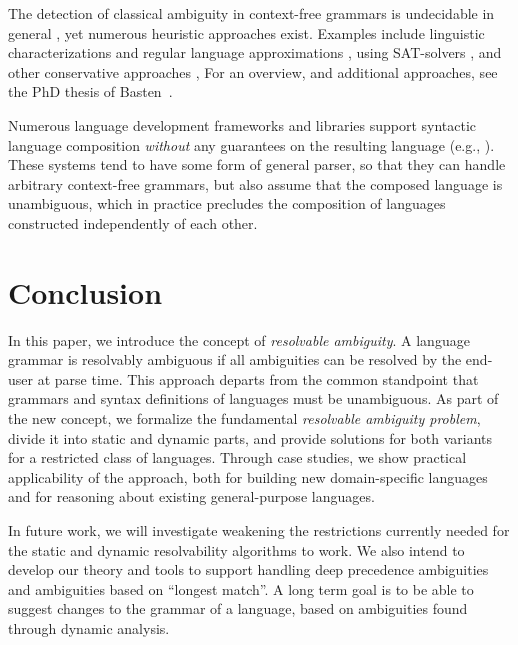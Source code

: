 \documentclass[runningheads]{llncs}
\begin{document}
The detection of classical ambiguity in context-free grammars is undecidable in general \cite{cantorAmbiguityProblemBackus1962}, yet numerous heuristic approaches exist. Examples include linguistic characterizations and regular language approximations \cite{brabrandAnalyzingAmbiguityContextFree2007}, using SAT-solvers \cite{axelssonAnalyzingContextFreeGrammars2008}, and other conservative approaches \cite{schmitzConservativeAmbiguityDetection2007}, For an overview, and additional approaches, see the PhD thesis of Basten~\cite{bastenAmbiguityDetectionProgramming2011}.

Numerous language development frameworks and libraries support syntactic language composition \emph{without} any guarantees on the resulting language (e.g., \cite{heeringSyntaxDefinitionFormalism1989}). These systems tend to have some form of general parser, so that they can handle arbitrary context-free grammars, but also assume that the composed language is unambiguous, which in practice precludes the composition of languages constructed independently of each other.


\section{Conclusion}
In this paper, we introduce the concept of \emph{resolvable
  ambiguity}. A language grammar is resolvably ambiguous if all
ambiguities can be resolved by the end-user at parse time. This
approach departs from the common standpoint that grammars and
syntax definitions of languages must be unambiguous.
%
As part of the new concept, we formalize the fundamental
\emph{resolvable ambiguity problem}, divide it into static and
dynamic parts, and provide solutions for both variants for a
restricted class of languages. Through case studies, we show
practical applicability of the approach, both for building new
domain-specific languages and for reasoning about existing
general-purpose languages.

In future work, we will investigate weakening the restrictions
currently needed for the static and dynamic resolvability
algorithms to work. We also intend to develop our theory and tools
to support handling deep precedence ambiguities and ambiguities
based on ``longest match''. A long term goal is to be able to
suggest changes to the grammar of a language, based on ambiguities
found through dynamic analysis.




\end{document}
